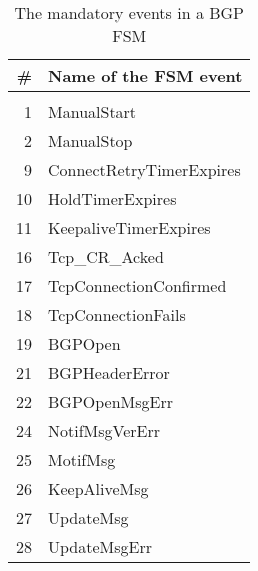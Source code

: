 \documentclass{acm_proc_article-sp}
\begin{document}
\begin{table}
\centering
    \begin{tabular}{r l}
    \# & Name of the FSM event    \\
    \hline                        \\
    1  & ManualStart              \\
    2  & ManualStop               \\
    9  & ConnectRetryTimerExpires \\
    10 & HoldTimerExpires         \\
    11 & KeepaliveTimerExpires    \\
    16 & Tcp\_CR\_Acked           \\
    17 & TcpConnectionConfirmed   \\
    18 & TcpConnectionFails       \\
    19 & BGPOpen                  \\
    21 & BGPHeaderError           \\
    22 & BGPOpenMsgErr            \\
    24 & NotifMsgVerErr           \\
    25 & MotifMsg                 \\
    26 & KeepAliveMsg             \\
    27 & UpdateMsg                \\
    28 & UpdateMsgErr             \\
    \end{tabular}
\caption{The mandatory events in a BGP FSM}
\label{tab:bgpfsmevent}
\end{table}
\end{document}
